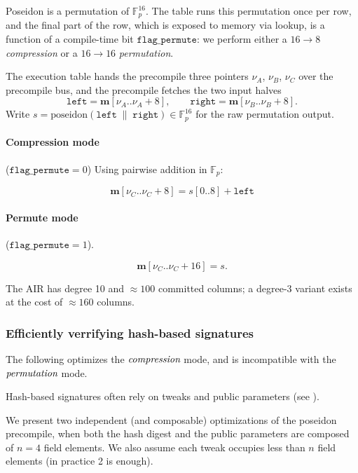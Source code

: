 \documentclass{article}
\theoremstyle{definition}
\newcommand{\Fp}{\mathbb F_p}
\begin{document}
Poseidon \cite{poseidon1} is a permutation of $\Fp^{16}$. The table runs this permutation once per row, and the final part of the row, which is exposed to memory via lookup, is a function of a compile-time bit $\texttt{flag\_permute}$: we perform either a $16 \to 8$ \emph{compression} or a $16 \to 16$ \emph{permutation}.

The execution table hands the precompile three pointers $\nu_A$, $\nu_B$, $\nu_C$ over the precompile bus, and the precompile fetches the two input halves
$$\texttt{left} = \textbf{m}[\nu_A..\nu_A + 8], \qquad \texttt{right} = \textbf{m}[\nu_B..\nu_B + 8].$$
Write $s = \text{poseidon}(\texttt{left} \;\|\; \texttt{right}) \in \Fp^{16}$ for the raw permutation output.

\vspace{2mm}

\paragraph{Compression mode} ($\texttt{flag\_permute} = 0$) Using pairwise addition in $\Fp$:

$$\textbf{m}[\nu_C..\nu_C + 8] = s[0..8] + \texttt{left}$$


\vspace{2mm}

\paragraph{Permute mode} ($\texttt{flag\_permute} = 1$). 

$$\textbf{m}[\nu_C..\nu_C + 16] = s.$$


\vspace{2mm}

The AIR has degree 10 and $\approx 100$ committed columns; a degree-3 variant exists at the cost of $\approx 160$ columns.
\subsubsection{Efficiently verrifying hash-based signatures}\label{efficiently_verrifying_hash-based_signatures}

The following optimizes the $\emph{compression}$ mode, and is incompatible with the $\emph{permutation}$ mode.

Hash-based signatures often rely on tweaks and public parameters (see \cite{ethereum_signatures}).

We present two independent (and composable) optimizations of the poseidon precompile, when both the hash digest and the public parameters are composed of $n = 4$ field elements. We also assume each tweak occupies less than $n$ field elements (in practice 2 is enough).
\end{document}
